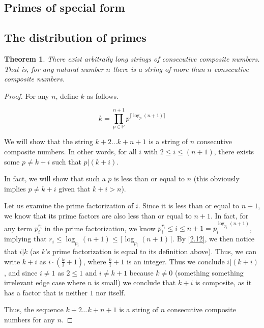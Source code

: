\documentclass{article}
\newtheorem{thm}{Theorem}[section]
\numberwithin{equation}{thm}
\begin{document}



\subsection*{Primes of special form}




\subsection*{The distribution of primes}

\begin{thm} \label{2.46}
  There exist arbitraily long strings of consecutive composite numbers. That is, for any natural number $n$ there is a string of more than $n$ consecutive composite numbers.
\end{thm}

\begin{proof}
  For any $n$, define $k$ as follows.

  $$k = \prod_{p \in \mathbb{P}}^{n+1} p^{\lceil \log_{p}(n+1) \rceil}$$

  We will show that the string $k+2 \ldots k+n+1$ is a string of $n$ consecutive composite numbers. In other words, for all $i$ with $2 \leq i \leq (n+1)$, there exists some $p \neq k+i$ such that $p | (k+i)$.

  In fact, we will show that such a $p$ is less than or equal to $n$ (this obviously implies $p \neq k+i$ given that $k+i > n$).

  Let us examine the prime factorization of $i$. Since it is less than or equal to $n+1$, we know that its prime factors are also less than or equal to $n+1$. In fact, for any term $p_i ^ {r_i}$ in the prime factorization, we know $p_i ^ {r_i} \leq i \leq n+1 = p_i ^ {\log_{p_i}(n+1)}$, implying that $r_i \leq \log_{p_i}(n+1) \leq \lceil \log_{p_i}(n+1) \rceil$.
  By \ref{2.12}, we then notice that $i | k$ (as $k$'s prime factorization is equal to its definition above).
  Thus, we can write $k+i$ as $i \cdot (\frac{k}{i} + 1)$, where $\frac{k}{i} + 1$ is an integer. Thus we conclude $i | (k + i)$, and since $i \neq 1$ as $2 \leq 1$ and $i \neq k+1$ because $k \neq 0$ (something something irrelevant edge case where $n$ is small) we conclude that $k+i$ is composite, as it has a factor that is neither $1$ nor itself.

  Thus, the sequence $k+2 \ldots k+n+1$ is a string of $n$ consecutive composite numbers for any $n$.
\end{proof}
\end{document}
